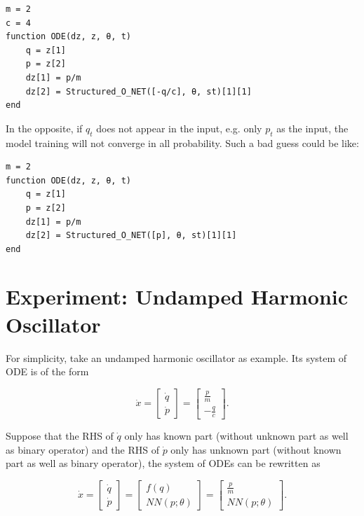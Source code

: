 \documentclass[
	parskip, 			   %
	twoside, 			   %
	DIV=14, 			   %
	BCOR=15.0mm, 		   %
	headsepline, 		   %
	open=right, 		   %
	captions=tableheading, %
	bibliography=totoc,    %
	numbers=noenddot       %
]{scrreprt}
\begin{document}
\begin{verbatim}
m = 2
c = 4
function ODE(dz, z, θ, t)
    q = z[1]
    p = z[2]
    dz[1] = p/m
    dz[2] = Structured_O_NET([-q/c], θ, st)[1][1]
end
\end{verbatim}

In the opposite, if $q_t$ does not appear in the input, e.g. only $p_t$ as the input, the model training will not converge in all probability. Such a bad guess could be like:

\begin{verbatim}
m = 2
function ODE(dz, z, θ, t)
    q = z[1]
    p = z[2]
    dz[1] = p/m
    dz[2] = Structured_O_NET([p], θ, st)[1][1]
end
\end{verbatim}

\section{Experiment: Undamped Harmonic Oscillator}
For simplicity, take an undamped harmonic oscillator as example. Its system of ODE is of the form

\begin{equation}
    \label{eq:ODE_udho}
    \dot{x} =
    \begin{bmatrix}
    \dot{q}\\
    \dot{p}
    \end{bmatrix}
    =
    \begin{bmatrix}
    \frac{p}{m}\\
    -\frac{q}{c}
    \end{bmatrix}.
\end{equation}

Suppose that the RHS of $\dot{q}$ only has known part (without unknown part as well as binary operator) and the RHS of $\dot{p}$ only has unknown part (without known part as well as binary operator), the system of ODEs can be rewritten as

\begin{equation}
    \label{eq:structured_ODE_udho}
    \dot{x} =
    \begin{bmatrix}
    \dot{q}\\
    \dot{p}
    \end{bmatrix}
    =
    \begin{bmatrix}
    {f(q)}\\
    {NN(p;\theta)}
    \end{bmatrix}
    =
    \begin{bmatrix}
    \frac{p}{m}\\
    NN(p;\theta)
    \end{bmatrix}.
\end{equation}
\end{document}
